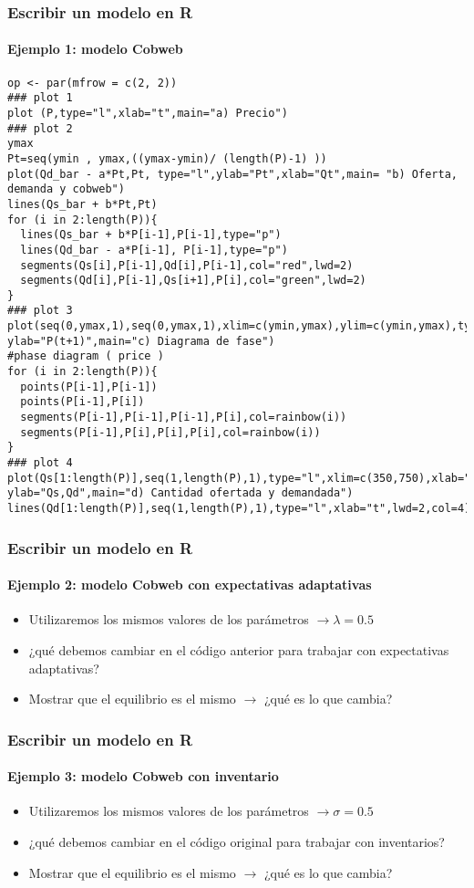 \documentclass[11pt]{beamer}
\begin{document}
\begin{frame}[fragile]
	\frametitle{Escribir un modelo en R}
	\framesubtitle{Ejemplo 1: modelo Cobweb}
\begin{verbatim}
op <- par(mfrow = c(2, 2))
### plot 1
plot (P,type="l",xlab="t",main="a) Precio") 
### plot 2
ymax
Pt=seq(ymin , ymax,((ymax-ymin)/ (length(P)-1) ))
plot(Qd_bar - a*Pt,Pt, type="l",ylab="Pt",xlab="Qt",main= "b) Oferta, demanda y cobweb") 
lines(Qs_bar + b*Pt,Pt)
for (i in 2:length(P)){
  lines(Qs_bar + b*P[i-1],P[i-1],type="p")
  lines(Qd_bar - a*P[i-1], P[i-1],type="p")
  segments(Qs[i],P[i-1],Qd[i],P[i-1],col="red",lwd=2)
  segments(Qd[i],P[i-1],Qs[i+1],P[i],col="green",lwd=2)
}
### plot 3
plot(seq(0,ymax,1),seq(0,ymax,1),xlim=c(ymin,ymax),ylim=c(ymin,ymax),type="l",xlab="P(t)",
ylab="P(t+1)",main="c) Diagrama de fase")
#phase diagram ( price )
for (i in 2:length(P)){
  points(P[i-1],P[i-1])
  points(P[i-1],P[i])
  segments(P[i-1],P[i-1],P[i-1],P[i],col=rainbow(i))
  segments(P[i-1],P[i],P[i],P[i],col=rainbow(i))
}
### plot 4
plot(Qs[1:length(P)],seq(1,length(P),1),type="l",xlim=c(350,750),xlab="t",lwd=2,col=2,
ylab="Qs,Qd",main="d) Cantidad ofertada y demandada") 
lines(Qd[1:length(P)],seq(1,length(P),1),type="l",xlab="t",lwd=2,col=4) 

\end{verbatim}
\end{frame}

\begin{frame}
	\frametitle{Escribir un modelo en R}
\framesubtitle{Ejemplo 2: modelo Cobweb con expectativas adaptativas}
\begin{itemize}
	\item Utilizaremos los mismos valores de los parámetros $\longrightarrow \lambda=0.5$  
	\item ¿qué debemos cambiar en el código anterior para trabajar con expectativas adaptativas?
	\item Mostrar que el equilibrio es el mismo $\longrightarrow$ ¿qué es lo que cambia?
\end{itemize}
\end{frame}

\begin{frame}
	\frametitle{Escribir un modelo en R}
	\framesubtitle{Ejemplo 3: modelo Cobweb con inventario}
	\begin{itemize}
		\item Utilizaremos los mismos valores de los parámetros $\longrightarrow \sigma=0.5$  
		\item ¿qué debemos cambiar en el código original para trabajar con inventarios?
		\item Mostrar que el equilibrio es el mismo $\longrightarrow$ ¿qué es lo que cambia?
	\end{itemize}
\end{frame}
\end{document}
